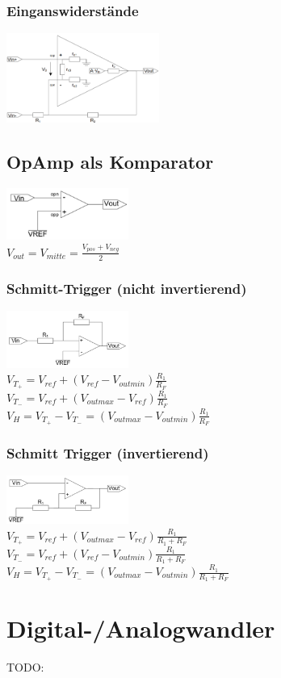 \documentclass[margin=normal]{tex/hsrzf}
\begin{document}
\begin{multicols*}{2}
  \subsubsection*{Einganswiderstände}
  \includegraphics[width=5cm]{img/OpAmp/Fehler_Eingangswiderstand.png}\\

\subsection{OpAmp als Komparator}
  \includegraphics[width=4cm]{img/OpAmp/Komparator.png}\\
  $V_{out} = V_{mitte} = \frac{V_{pos} + V_{neg}}{2}$
  \subsubsection*{Schmitt-Trigger (nicht invertierend)}

  \includegraphics[width=4cm]{img/OpAmp/Schmitt-Trigger_nicht_invertierend.png}\\

  $V_{T_+} = V_{ref} + (V_{ref} - V_{out min})\frac{R_1}{R_F} $ \\
  $V_{T_-} = V_{ref} + (V_{out max} - V_{ref})\frac{R_1}{R_F} $\\
  $V_H = V_{T_+} - V_{T_-} = (V_{outmax} - V_{outmin})\frac{R_1}{R_F}$

  \subsubsection*{Schmitt Trigger (invertierend)}
  \includegraphics[width=4cm]{img/OpAmp/Schmitt-Trigger_invertierend.png}\\
  $V_{T_+} = V_{ref} + (V_{out max} - V_{ref})\frac{R_1}{R_1 + R_F} $ \\
  $V_{T_-} = V_{ref} + (V_{ref} - V_{out min})\frac{R_1}{R_1 + R_F} $\\
  $V_H = V_{T_+} - V_{T_-} = (V_{outmax} - V_{outmin})\frac{R_1}{R_1+R_F}$
\end{multicols*}
\newpage
\section{Digital-/Analogwandler}
TODO: %
\end{document}
